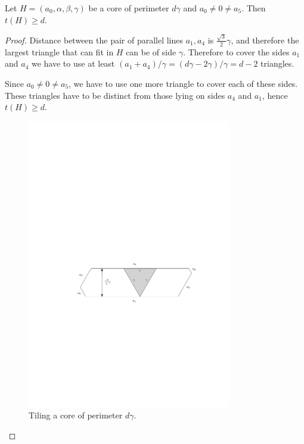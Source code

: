 \begin{lem}
\label{lem:core-dissection-bound}
Let $H = (a_0, \alpha, \beta, \gamma)$ be a core of perimeter $d\gamma$ and $a_0 \ne 0 \ne a_5$. Then $t(H) \geq d$.
\end{lem}
\begin{proof}
Distance between the pair of parallel lines $a_1, a_4$ is $\frac{\sqrt{3}}{2}\gamma$, and therefore the largest triangle that can fit in $H$ can be of side $\gamma$. Therefore to cover the sides $a_1$ and $a_4$ we have to use at least $(a_1+a_4)/\gamma = (d\gamma-2\gamma)/\gamma = d-2$ triangles.

Since $a_0 \ne 0 \ne a_5$, we have to use one more triangle to cover each of these sides. These triangles have to be distinct from those lying on sides $a_4$ and $a_1$, hence $t(H) \geq d$.

\begin{figure}[htb]
\centering
\includegraphics[width=0.8\textwidth]{img/core_tiling_lower_bound.pdf}
\caption{Tiling a core of perimeter $d\gamma$.}
\label{fig:core-tiling-lower-bound}
\end{figure}\end{proof}


